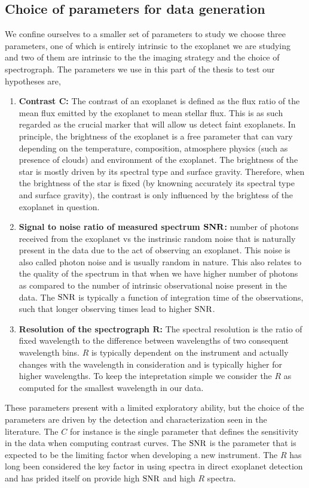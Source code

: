 \subsection{ Choice of parameters for data generation}
We confine ourselves to a smaller set of parameters to study we choose three parameters, one of which is entirely intrinsic to the exoplanet we are studying and two of them are intrinsic to the the imaging strategy and the choice of spectrograph.
The parameters we use in this part of the thesis to test our hypotheses are,
 \begin{enumerate}
     \item \textbf{Contrast $\mathbf{C}$:}
     The contrast of an exoplanet is defined as the flux ratio of the mean flux emitted by the exoplanet to mean stellar flux. 
     This is as such regarded as the crucial marker that will allow us detect faint exoplanets. 
     In principle, the brightness of the exoplanet is a free parameter that can vary depending on the temperature, composition, atmosphere physics (such as presence of clouds) and environment of the exoplanet. 
     The brightness of the star is mostly driven by its spectral type and surface gravity.
     Therefore, when the brightness of the star is fixed (by knowning accurately its spectral type and surface gravity), the contrast is only influenced by the brightess of the exoplanet in question.
     \item \textbf{Signal to noise ratio of measured spectrum $\rm{\mathbf{SNR}}$:} number of photons received from the exoplanet vs the instrinsic random noise that is naturally present in the data due to the act of observing an exoplanet.
     This noise is also called photon noise and is usually random in nature.
     This also relates to the quality of the spectrum in that when we have higher number of photons as compared to the number of intrinsic observational noise present in the data.
     The $\rm{SNR}$ is typically a function of integration time of the observations, such that longer observing times lead to higher $\rm{SNR}$.
     \item \textbf{Resolution of the spectrograph $\mathbf{R}$:}
     The spectral resolution is the ratio of fixed wavelength to the difference between wavelengths of two consequent wavelength bins.
     $R$ is typically dependent on the instrument and actually changes with the wavelength in consideration and is typically higher for higher wavelengths.
     To keep the intepretation simple we consider the $R$ as computed for the smallest wavelength in our data.
 \end{enumerate}
These parameters present with a limited exploratory ability, but the choice of the parameters are driven by the detection and characterization seen in the literature.
The $C$ for instance is the single parameter that defines the sensitivity in the data when computing contrast curves. 
The $\rm{SNR}$ is the parameter that is expected to be the limiting factor when developing a new instrument.
The $R$ has long been considered the key factor in using spectra in direct exoplanet detection and \citep[KPIC, ][]{2016Mawet} has prided itself on provide high $\rm{SNR}$ and high $R$ spectra.
